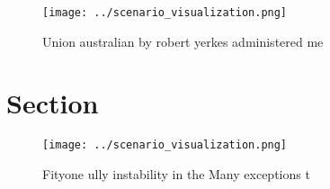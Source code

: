 \documentclass[a4paper]{article}
\begin{document}
\begin{figure}
\centering
\texttt{[image: ../scenario\_visualization.png]}
\caption{Union australian by robert yerkes administered me
}
\end{figure}
 
\section{Section}

\begin{figure}
\centering
\texttt{[image: ../scenario\_visualization.png]}
\caption{Fityone ully instability in the Many exceptions t
}
\end{figure}
 
\end{document}
